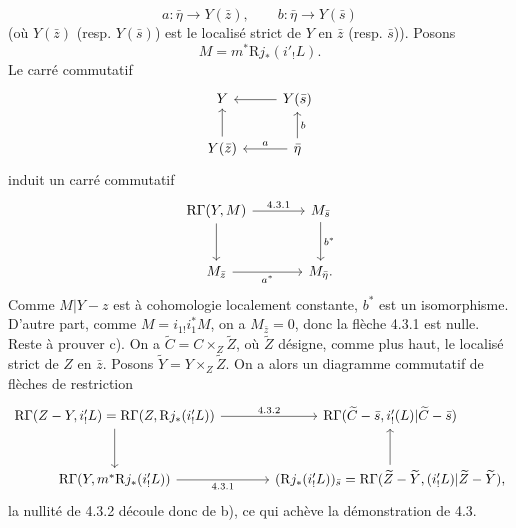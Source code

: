 \documentclass[11pt]{article}
\newcommand{\R}{\mathrm{R}}\newcommand{\RHomCore}{\mathrm{RHom}}
\providecommand{\R}{\mathrm R}
\begin{document}
\[
a:\bar\eta\to Y(\bar z),\qquad b:\bar\eta\to Y(\bar s)
\]
(où $Y(\bar z)$ (resp. $Y(\bar s)$) est le localisé strict de $Y$ en $\bar z$ (resp. $\bar s$)). Posons
\[
M=m^*\R j_*(i'_!L).
\]
Le carré commutatif
\[
\begin{tikzcd}
Y & Y(\bar s)\arrow[l]\\
Y(\bar z)\arrow[u] & \bar\eta \arrow[l,"a"']\arrow[u,"b"']
\end{tikzcd}
\]
induit un carré commutatif
\[
\begin{tikzcd}[column sep=large,row sep=large]
\R\Gamma(Y,M) \arrow[r,"4.3.1"] \arrow[d] & M_{\bar s} \arrow[d,"b^*"]\\
M_{\bar z} \arrow[r,"a^*"'] & M_{\bar\eta}.
\end{tikzcd}
\]
Comme $M|Y-z$ est à cohomologie localement constante, $b^*$ est un isomorphisme. D'autre part, comme $M=i_{1!}i_1^*M$, on a $M_{\bar z}=0$, donc la flèche 4.3.1 est nulle. Reste à prouver c). On a $\widetilde C=C\times_Z\widetilde Z$, où $\widetilde Z$ désigne, comme plus haut, le localisé strict de $Z$ en $\bar z$. Posons $\widetilde Y=Y\times_Z\widetilde Z$. On a alors un diagramme commutatif de flèches de restriction
\[
\begin{tikzcd}[column sep=large,row sep=large]
\R\Gamma(Z-Y,i'_!L)=\R\Gamma(Z,\R j_*(i'_!L))
 \arrow[r,"4.3.2"] \arrow[d]
&
\R\Gamma(\widetilde C-\bar s,i'_!(L)|\widetilde C-\bar s)\\
\R\Gamma(Y,m^*\R j_*(i'_!L)) \arrow[r,"4.3.1"']
&
(\R j_*(i'_!L))_{\bar s}
  =\R\Gamma(\widetilde Z-\widetilde Y,(i'_!L)|\widetilde Z-\widetilde Y) , \arrow[u]
\end{tikzcd}
\]
la nullité de 4.3.2 découle donc de b), ce qui achève la démonstration de 4.3.
\end{document}
